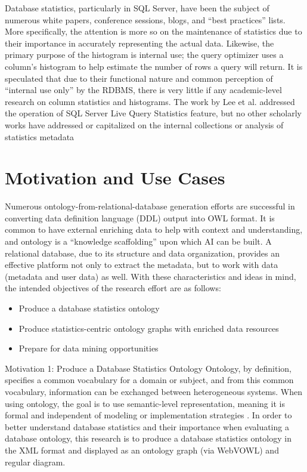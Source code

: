 \documentclass[sigconf]{acmart}
\begin{document}
Database statistics, particularly in SQL Server, have been the subject of numerous white
papers, conference sessions, blogs, and “best practices” lists. More specifically, the attention is
more so on the maintenance of statistics due to their importance in accurately representing the
actual data. Likewise, the primary purpose of the histogram is internal use; the query optimizer
uses a column’s histogram to help estimate the number of rows a query will return. It is
speculated that due to their functional nature and common perception of “internal use only” by
the RDBMS, there is very little if any academic-level research on column statistics and
histograms. The work by Lee et al. \cite{lee2016operator} addressed the operation of SQL Server Live Query
Statistics feature, but no other scholarly works have addressed or capitalized on the internal
collections or analysis of statistics metadata

\section{Motivation and Use Cases}
Numerous ontology-from-relational-database generation efforts are successful in
converting data definition language (DDL) output into OWL format. It is common to have
external enriching data to help with context and understanding, and ontology is a “knowledge
scaffolding” upon which AI can be built. A relational database, due to its structure and data
organization, provides an effective platform not only to extract the metadata, but to work with
data (metadata and user data) as well. With these characteristics and ideas in mind, the intended
objectives of the research effort are as follows:
\begin{itemize}
	\item Produce a database statistics ontology
	\item Produce statistics-centric ontology graphs with enriched data resources
	\item Prepare for data mining opportunities
\end{itemize}

Motivation 1: Produce a Database Statistics Ontology
Ontology, by definition, specifies a common vocabulary for a domain or subject, and
from this common vocabulary, information can be exchanged between heterogeneous systems.
When using ontology, the goal is to use semantic-level representation, meaning it is formal and
independent of modeling or implementation strategies \cite{gruber}. In order to better
understand database statistics and their importance when evaluating a database ontology, this
research is to produce a database statistics ontology in the XML format and displayed as an
ontology graph (via WebVOWL) and regular diagram.
\end{document}
